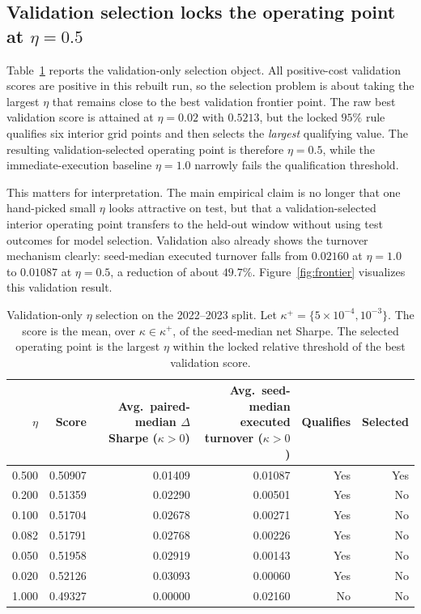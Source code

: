 \documentclass[10pt,twocolumn]{article}
\begin{document}
\subsection{Validation selection locks the operating point at \texorpdfstring{$\eta=0.5$}{eta=0.5}}
Table~\ref{tab:validation_selection} reports the validation-only selection object. All positive-cost validation scores are positive in this rebuilt run, so the selection problem is about taking the largest $\eta$ that remains close to the best validation frontier point. The raw best validation score is attained at $\eta=0.02$ with $0.5213$, but the locked $95\%$ rule qualifies six interior grid points and then selects the \emph{largest} qualifying value. The resulting validation-selected operating point is therefore $\eta=0.5$, while the immediate-execution baseline $\eta=1.0$ narrowly fails the qualification threshold.

This matters for interpretation. The main empirical claim is no longer that one hand-picked small $\eta$ looks attractive on test, but that a validation-selected interior operating point transfers to the held-out window without using test outcomes for model selection. Validation also already shows the turnover mechanism clearly: seed-median executed turnover falls from $0.02160$ at $\eta=1.0$ to $0.01087$ at $\eta=0.5$, a reduction of about $49.7\%$. Figure~\ref{fig:frontier} visualizes this validation result.

\begin{table}[t]
\centering
\scriptsize
\caption{Validation-only $\eta$ selection on the 2022--2023 split. Let $\kappa^+=\{5\times10^{-4},10^{-3}\}$. The score is the mean, over $\kappa\in\kappa^+$, of the seed-median net Sharpe. The selected operating point is the largest $\eta$ within the locked relative threshold of the best validation score.}
\label{tab:validation_selection}
\begin{tabular}{@{}rrrrrr@{}}
\toprule
$\eta$ & Score & Avg.\ paired-median $\Delta$Sharpe ($\kappa>0$) & Avg.\ seed-median executed turnover ($\kappa>0$) & Qualifies & Selected \\
\midrule
0.500 & 0.50907 & 0.01409 & 0.01087 & Yes & Yes \\
0.200 & 0.51359 & 0.02290 & 0.00501 & Yes & No \\
0.100 & 0.51704 & 0.02678 & 0.00271 & Yes & No \\
0.082 & 0.51791 & 0.02768 & 0.00226 & Yes & No \\
0.050 & 0.51958 & 0.02919 & 0.00143 & Yes & No \\
0.020 & 0.52126 & 0.03093 & 0.00060 & Yes & No \\
1.000 & 0.49327 & 0.00000 & 0.02160 & No & No \\
\bottomrule
\end{tabular}
\end{table}
\end{document}
